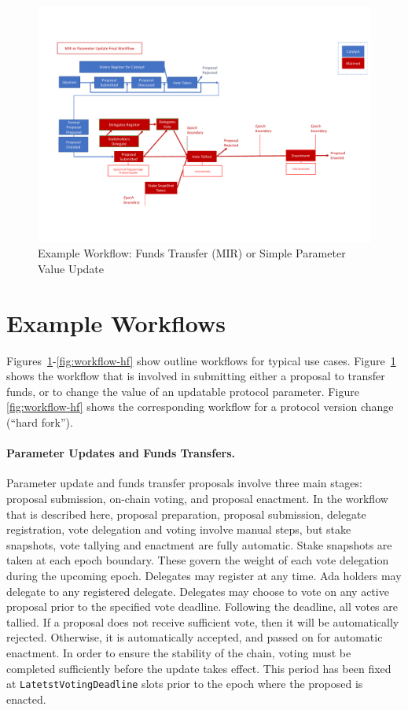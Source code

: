 \begin{figure}
  \includegraphics[trim=0 90 0 80,clip,width=\textwidth]{Workflow1}
  \caption{Example Workflow: Funds Transfer (MIR) or Simple Parameter Value Update}
  \label{fig:workflow-mir}
\end{figure}

\section{Example Workflows}
\label{sec:workflows}

Figures~\ref{fig:workflow-mir}-\ref{fig:workflow-hf} show outline workflows for
typical use cases.  Figure~\ref{fig:workflow-mir} shows the workflow that is
involved in submitting either a proposal to transfer funds, or to change the
value of an updatable protocol parameter.  Figure \ref{fig:workflow-hf} shows
the corresponding workflow for a protocol version change (``hard fork'').

\paragraph{Parameter Updates and Funds Transfers.}  Parameter update and funds transfer proposals involve three main stages:
proposal submission, on-chain voting, and proposal enactment.  In the workflow that is described
here, proposal preparation, proposal submission, delegate registration,
vote delegation and voting involve manual steps, but stake snapshots, vote tallying
and enactment are fully automatic.  Stake snapshots are taken at each epoch boundary.
These govern the weight of each vote delegation during the upcoming epoch.
%
Delegates may register at any time.  Ada holders may delegate to any registered delegate.
Delegates may choose to vote on any active proposal prior to the specified vote deadline.
Following the deadline, all votes are tallied.  If a proposal does not receive sufficient vote, then
it will be automatically rejected.  Otherwise, it is automatically accepted, and passed on for
automatic enactment.
In order to ensure the stability of the chain, voting must be completed sufficiently before the update takes
effect.  This period has been fixed at \texttt{LatetstVotingDeadline} slots prior to the epoch where the proposed is enacted.

